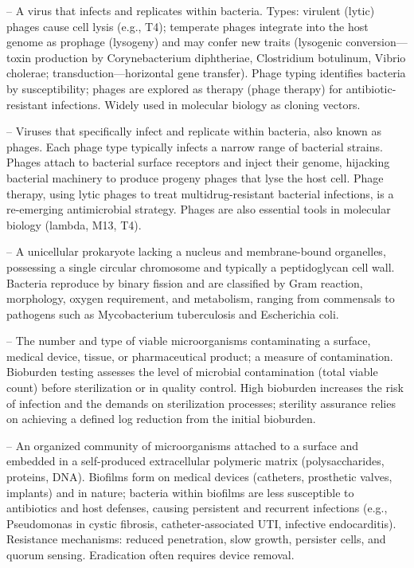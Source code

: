 -- A virus that infects and replicates within bacteria. Types: virulent (lytic) phages cause cell lysis (e.g., T4); temperate phages integrate into the host genome as prophage (lysogeny) and may confer new traits (lysogenic conversion—toxin production by Corynebacterium diphtheriae, Clostridium botulinum, Vibrio cholerae; transduction—horizontal gene transfer). Phage typing identifies bacteria by susceptibility; phages are explored as therapy (phage therapy) for antibiotic-resistant infections. Widely used in molecular biology as cloning vectors.

-- Viruses that specifically infect and replicate within bacteria, also known as phages. Each phage type typically infects a narrow range of bacterial strains. Phages attach to bacterial surface receptors and inject their genome, hijacking bacterial machinery to produce progeny phages that lyse the host cell. Phage therapy, using lytic phages to treat multidrug-resistant bacterial infections, is a re-emerging antimicrobial strategy. Phages are also essential tools in molecular biology (lambda, M13, T4).

-- A unicellular prokaryote lacking a nucleus and membrane-bound organelles, possessing a single circular chromosome and typically a peptidoglycan cell wall. Bacteria reproduce by binary fission and are classified by Gram reaction, morphology, oxygen requirement, and metabolism, ranging from commensals to pathogens such as Mycobacterium tuberculosis and Escherichia coli.

-- The number and type of viable microorganisms contaminating a surface, medical device, tissue, or pharmaceutical product; a measure of contamination. Bioburden testing assesses the level of microbial contamination (total viable count) before sterilization or in quality control. High bioburden increases the risk of infection and the demands on sterilization processes; sterility assurance relies on achieving a defined log reduction from the initial bioburden.

-- An organized community of microorganisms attached to a surface and embedded in a self-produced extracellular polymeric matrix (polysaccharides, proteins, DNA). Biofilms form on medical devices (catheters, prosthetic valves, implants) and in nature; bacteria within biofilms are less susceptible to antibiotics and host defenses, causing persistent and recurrent infections (e.g., Pseudomonas in cystic fibrosis, catheter-associated UTI, infective endocarditis). Resistance mechanisms: reduced penetration, slow growth, persister cells, and quorum sensing. Eradication often requires device removal.

